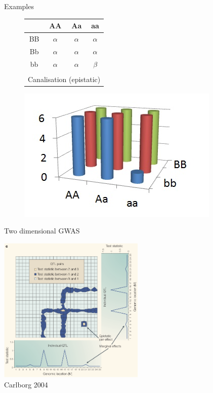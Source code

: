 \documentclass{beamer}
\begin{document}
\begin{frame}{Examples}
\begin{figure}[htb]
 \centering
 \begin{minipage}[c]{0.38\textwidth}
   \centering
{\tiny
\begin{tabular}{cccc}
& AA & Aa & aa \\\hline
BB & $\alpha$ & $\alpha$ & $\alpha$ \\
Bb & $\alpha$ & $\alpha$ & $\alpha$ \\
bb & $\alpha$ & $\alpha$ & $\beta$ \\
&&&\\
\multicolumn{4}{l}{Canalisation (epistatic)}\\
\end{tabular} }
 \end{minipage}
 \begin{minipage}[c]{0.38\textwidth}
 \includegraphics[width=\textwidth]{canalisation.jpg}
 \end{minipage}
\end{figure}
\end{frame}

\begin{frame}{Two dimensional GWAS}
\begin{center}
\includegraphics[width=7cm]{2dscan.png} \\
{\tiny Carlborg 2004}
\end{center}
\end{frame}
\end{document}
